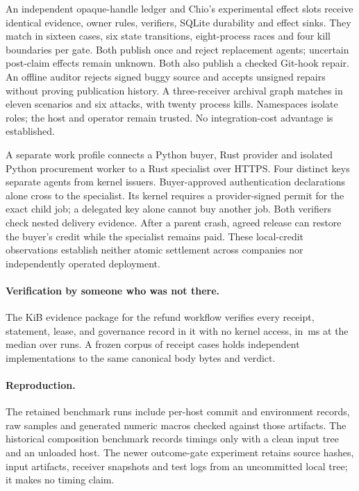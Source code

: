An independent opaque-handle ledger and Chio's experimental effect slots
receive identical evidence, owner rules, verifiers, SQLite durability and
effect sinks. They match in sixteen cases, six state transitions, eight-process
races and four kill boundaries per gate. Both publish once and reject
replacement agents; uncertain post-claim effects remain unknown.
Both also publish a checked Git-hook repair. An offline auditor rejects signed
buggy source and accepts unsigned repairs without proving publication history.
A three-receiver archival graph matches in eleven scenarios and six attacks,
with twenty process kills. Namespaces isolate roles; the host and operator
remain trusted. No integration-cost advantage is established.

A separate work profile connects a Python buyer, Rust provider and isolated
Python procurement worker to a Rust specialist over HTTPS. Four distinct keys
separate agents from kernel issuers. Buyer-approved authentication declarations
alone cross to the specialist. Its kernel requires a provider-signed permit
for the exact child job; a delegated key alone cannot buy another job.
Both verifiers check nested delivery evidence. After a parent crash, agreed
release can restore the buyer's credit while the specialist remains paid.
These local-credit observations establish neither atomic settlement across
companies nor independently operated deployment.

\paragraph{Verification by someone who was not there.}
The \PSProofPackageKiB{} KiB evidence package for the refund workflow verifies
every receipt, statement, lease, and governance record in it with no kernel
access, in \,ms at the median over
\PSBuyerVerifySampleCount{} runs. A frozen corpus of
\PSVectorCaseCount{} receipt cases holds \PSVectorLanguages{} independent
implementations to the same canonical body bytes and verdict.

\paragraph{Reproduction.}
The retained benchmark runs include per-host commit and environment records,
raw samples and generated numeric macros checked against those artifacts.
The historical composition benchmark records timings only with a clean input
tree and an unloaded host. The newer outcome-gate experiment retains source
hashes, input artifacts, receiver snapshots and test logs from an uncommitted
local tree; it makes no timing claim.
